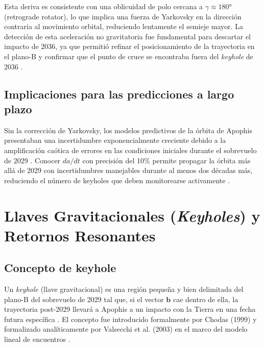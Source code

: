 \documentclass[a4paper]{article}
\begin{document}
Esta deriva es consistente con una oblicuidad de polo cercana a $\gamma \approx 180°$ (retrograde rotator), lo que implica una fuerza de Yarkovsky en la dirección contraria al movimiento orbital, reduciendo lentamente el semieje mayor. La detección de esta aceleración no gravitatoria fue fundamental para descartar el impacto de 2036, ya que permitió refinar el posicionamiento de la trayectoria en el plano-B y confirmar que el punto de cruce se encontraba fuera del \textit{keyhole} de 2036 \cite{farnocchia2013yarkovsky, brozovic2018radar}.

\subsection{Implicaciones para las predicciones a largo plazo}

Sin la corrección de Yarkovsky, los modelos predictivos de la órbita de Apophis presentaban una incertidumbre exponencialmente creciente debido a la amplificación caótica de errores en las condiciones iniciales durante el sobrevuelo de 2029 \cite{farnocchia2013yarkovsky, vokrouhlicky2015yarkovsky}. Conocer $da/dt$ con precisión del 10\% permite propagar la órbita más allá de 2029 con incertidumbres manejables durante al menos dos décadas más, reduciendo el número de keyholes que deben monitorearse activamente \cite{farnocchia2023orbit}.

\section{Llaves Gravitacionales (\textit{Keyholes}) y Retornos Resonantes}

\subsection{Concepto de keyhole}

Un \textit{keyhole} (llave gravitacional) es una región pequeña y bien delimitada del plano-B del sobrevuelo de 2029 tal que, si el vector $\mathbf{b}$ cae dentro de ella, la trayectoria post-2029 llevará a Apophis a un impacto con la Tierra en una fecha futura específica \cite{chesley2005keyholes, valsecchi2003resonant}. El concepto fue introducido formalmente por Chodas (1999) y formalizado analíticamente por Valsecchi et al. (2003) en el marco del modelo lineal de encuentros \cite{valsecchi2003resonant}.
\end{document}
